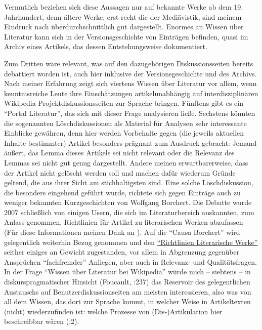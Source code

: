\documentclass[fontsize=12pt]{scrartcl}
\begin{document}
Vermutlich beziehen sich diese Aussagen nur auf bekannte Werke ab dem 19. Jahrhundert, denn \"altere Werke, erst recht die der Medi\"avistik, sind meinem Eindruck nach \"uberdurchschnittlich gut dargestellt. Enormes an Wissen \"uber Li\-te\-ra\-tur kann sich in der Versionsgeschichte von Eintr\"agen befinden, quasi im Archiv eines Artikels, das dessen Entstehungsweise dokumentiert.
 
Zum Dritten w\"are relevant, was auf den dazugeh\"origen Dis\-kus\-si\-onssei\-ten bereits debattiert worden ist, auch \mbox{hier} inklusive der Versionsgeschichte und des Archivs. Nach meiner Erfah\-rung zeigt sich 
vier\-tens Wissen \"uber Li\-te\-ra\-tur vor allem, wenn kenntnisreiche Leute ihre Einsch\"atzungen artikelunabh\"angig auf interdisziplin\"aren Wi\-ki\-pe\-dia-Projektdis\-kus\-si\-onssei\-ten zur Spra\-che brin\-gen.
F\"unf\-tens gibt es ein "`Portal Li\-te\-ra\-tur"', das sich mit dieser Frage ana\-lysieren lie{\ss}e. Sechstens k\"onn\-ten die sogenannten L\"oschdis\-kus\-si\-onen als Material f\"ur Ana\-lysen sehr interessante Einblicke gew\"ahren, denn \mbox{hier} werden Vorbehalte gegen (die jeweils aktuellen Inhalte bestimmter) Artikel besonders pr\"agnant zum Ausdruck gebracht: Jemand \"au{\ss}ert, das Lemma dieses Artikels sei nicht relevant oder die Relevanz des Lemmas sei nicht gut genug dargestellt. Andere meinen erwartbarerweise, dass der Artikel nicht gel\"oscht werden soll und machen daf\"ur wiederum Gr\"unde geltend, die aus ihrer Sicht am stichhaltigsten sind. Eine solche L\"oschdis\-kus\-si\-on, die besonders eingehend gef\"uhrt wurde, richtete sich gegen Eintr\"age auch zu weniger bekannten Kurzgeschichten von Wolfgang Borchert. Die Debatte wurde 2007 schlie{\ss}lich von einigen Usern, die sich im Li\-te\-ra\-tur\-bereich auskannten, zum Anlass genommen, Richtlinien f\"ur Artikel zu li\-te\-ra\-rischen Werken abzufassen (F\"ur diese Informationen meinen Dank an \cite{UserMagiers2015a}). Auf die "`Causa Borchert"' wird gelegentlich wei\-terhin Bezug genommen und den \href{http://de.wikipedia.org/wiki/Wikipedia:Richtlinien_Literarische_Werke}{"`Richtlinien Li\-te\-ra\-rische Werke"'} seither einiges an Gewicht zugestanden, vor allem in Abgrenzung gegen\"uber Anspr\"uchen "`fachfremder"' Anliegen, aber auch in Relevanz- und Qualit\"atsfragen. In der Frage "`Wissen \"uber Li\-te\-ra\-tur bei Wi\-ki\-pe\-dia"' w\"urde mich -- siebtens -- in diskurspragmatischer Hinsicht (Foucault, \cite{Hetzel2012}:237) das Reservoir des gelegentlichen Austauschs auf Be\-nut\-zerdis\-kus\-si\-onsei\-ten am meisten interessieren, also was von all dem Wissen, das dort zur Sprache kommt, in welcher Weise in Artikeltexten (nicht) wiederzufinden ist: welche Prozesse von (Dis-)Artikulation \mbox{hier} beschreibbar w\"aren (\cite{Michaelis2011}:2).
\end{document}
